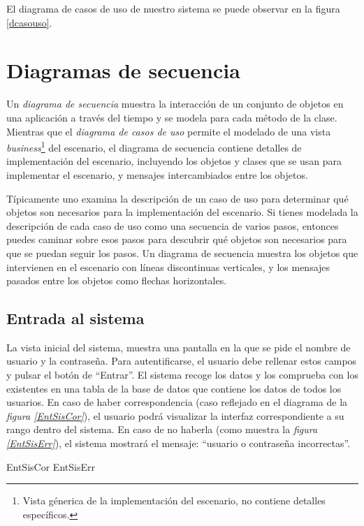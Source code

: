 \documentclass[11pt,a4paper,spanish,twoside]{book}
\begin{document}
El diagrama de casos de uso de nuestro sistema se puede observar en la figura
\ref{dcasouso}.


\chapter{Diagramas de secuencia}
Un \emph{diagrama de secuencia} muestra la interacción de un conjunto de
objetos en una aplicación a través del tiempo y se modela para cada método de
la clase. Mientras que el \emph{diagrama de casos de uso} permite el modelado
de una vista \emph{business}\footnote{Vista génerica de la implementación del
escenario, no contiene detalles específicos.} del escenario, el diagrama de 
secuencia contiene detalles de implementación del escenario, incluyendo los 
objetos y clases que se usan para implementar el escenario, y mensajes 
intercambiados entre los objetos.

Típicamente uno examina la descripción de un caso de uso para determinar qué
objetos son necesarios para la implementación del escenario. Si tienes
modelada la descripción de cada caso de uso como una secuencia de varios
pasos, entonces puedes caminar sobre esos pasos para descubrir qué objetos
son necesarios para que se puedan seguir los pasos. Un diagrama de secuencia
muestra los objetos que intervienen en el escenario con líneas discontinuas
verticales, y los mensajes pasados entre los objetos como flechas horizontales.

\section{Entrada al sistema}
La vista inicial del sistema, muestra una pantalla en la que se pide el nombre
de usuario y la contraseña. Para autentificarse, el usuario debe rellenar
estos campos y pulsar el botón de ``Entrar''. El sistema recoge los datos y los
comprueba con los existentes en una tabla de la base de datos que contiene los
datos de todos los usuarios. En caso de haber correspondencia (caso reflejado
en el diagrama de la \emph{figura \ref{EntSisCor}}), el usuario podrá
visualizar la interfaz correspondiente a su rango dentro del sistema. En caso
de no haberla (como muestra la \emph{figura \ref{EntSisErr}}), el sistema 
mostrará el mensaje: ``usuario o contraseña incorrectas''.

{EntSisCor}
{EntSisErr}
\end{document}
